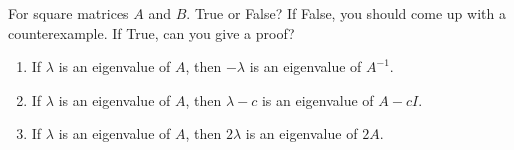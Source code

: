 \documentclass{ximera}
\author{}
\begin{document}
\begin{exercise}

For square matrices $A$ and $B$.  True or False?  If False, you should come up with a counterexample.  If True, can you give a proof?

 \begin{enumerate}
 
\item If $\lambda$ is an eigenvalue of $A$, then $-\lambda$ is an eigenvalue of $A^{-1}$.
 \begin{multipleChoice}
 \end{multipleChoice}

 \item If $\lambda$ is an eigenvalue of $A$, then $\lambda - c$ is an eigenvalue of $A - cI$.
 \begin{multipleChoice}
 \end{multipleChoice}

 \item If $\lambda$ is an eigenvalue of $A$, then $2\lambda$ is an eigenvalue of $2A$.
 \begin{multipleChoice}
 \end{multipleChoice}



 \end{enumerate}

 
\end{exercise}
\end{document}
